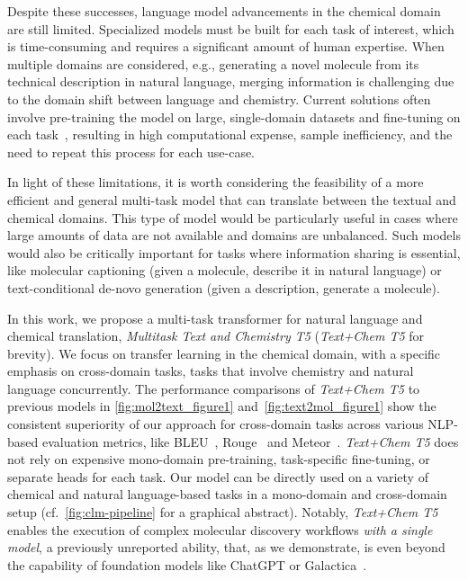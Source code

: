 \documentclass[nohyperref]{article}
\theoremstyle{plain}
\theoremstyle{definition}
\theoremstyle{remark}
\begin{document}
Despite these successes, language model advancements in the chemical domain are still limited. Specialized models must be built for each task of interest, which is time-consuming and requires a significant amount of human expertise. When multiple domains are considered, e.g., generating a novel molecule from its technical description in natural language, merging information is challenging due to the domain shift between language and chemistry. Current solutions often involve pre-training the model on large, single-domain datasets and fine-tuning on each task~\citep{edwards2021text2mol}, resulting in high computational expense, sample inefficiency, and the need to repeat this process for each use-case.

In light of these limitations, it is worth considering the feasibility of a more efficient and general multi-task model that can translate between the textual and chemical domains. This type of model would be particularly useful in cases where large amounts of data are not available and domains are unbalanced. Such models would also be critically important for tasks where information sharing is essential, like molecular captioning (given a molecule, describe it in natural language) or text-conditional de-novo generation (given a description, generate a molecule).

In this work, we propose a multi-task transformer for natural language and chemical translation, 
\emph{Multitask Text and Chemistry T5} (\emph{Text+Chem T5} for brevity). We focus on transfer learning in the chemical domain, with a specific emphasis on cross-domain tasks, tasks that involve chemistry and natural language concurrently. 
The performance comparisons of \emph{Text+Chem T5} to previous models in \autoref{fig:mol2text_figure1} and~\autoref{fig:text2mol_figure1} show the consistent superiority of our approach for cross-domain tasks across various NLP-based evaluation metrics, like BLEU~\cite{papineni2002bleu}, Rouge~\cite{lin2004rouge} and Meteor~\cite{banerjee-lavie-2005-meteor}.
\emph{Text+Chem T5} does not rely on expensive mono-domain pre-training, task-specific fine-tuning, or separate heads for each task. Our model can be directly used on a variety of chemical and natural language-based tasks in a mono-domain and cross-domain setup (cf.~\autoref{fig:clm-pipeline} for a graphical abstract).
Notably, \emph{Text+Chem T5} enables the execution of complex molecular discovery workflows \textit{with a single model}, a previously unreported ability, that, as we demonstrate, is even beyond the capability of foundation models like ChatGPT or Galactica~\citep{taylor2022galactica}.
\end{document}
